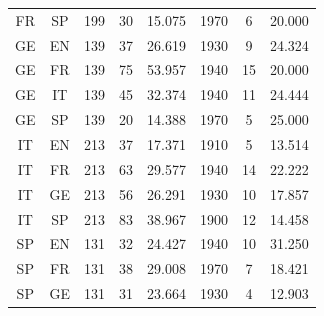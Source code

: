 \documentclass[10pt,letterpaper]{article} %
\begin{document}
\begin{table}
\begin{tabular}{cccccccc}
		FR &       SP &                    199 &                      30 &             15.075 &                    1970 &                             6 &                             20.000 \\
		GE &       EN &                    139 &                      37 &             26.619 &                    1930 &                             9 &                             24.324 \\
		GE &       FR &                    139 &                      75 &             53.957 &                    1940 &                            15 &                             20.000 \\
		GE &       IT &                    139 &                      45 &             32.374 &                    1940 &                            11 &                             24.444 \\
		GE &       SP &                    139 &                      20 &             14.388 &                    1970 &                             5 &                             25.000 \\
		IT &       EN &                    213 &                      37 &             17.371 &                    1910 &                             5 &                             13.514 \\
		IT &       FR &                    213 &                      63 &             29.577 &                    1940 &                            14 &                             22.222 \\
		IT &       GE &                    213 &                      56 &             26.291 &                    1930 &                            10 &                             17.857 \\
		IT &       SP &                    213 &                      83 &             38.967 &                    1900 &                            12 &                             14.458 \\
		SP &       EN &                    131 &                      32 &             24.427 &                    1940 &                            10 &                             31.250 \\
		SP &       FR &                    131 &                      38 &             29.008 &                    1970 &                             7 &                             18.421 \\
		SP &       GE &                    131 &                      31 &             23.664 &                    1930 &                             4 &                             12.903 \\

\end{tabular}
\end{table}
\end{document}
